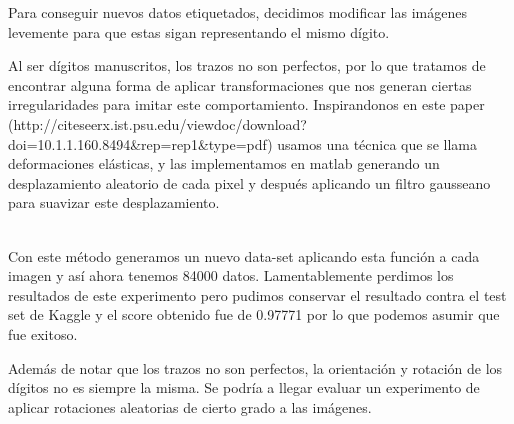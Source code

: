 Para conseguir nuevos datos etiquetados, decidimos modificar las imágenes levemente para que estas sigan representando el mismo dígito.

Al ser dígitos manuscritos, los trazos no son perfectos, por lo que tratamos de encontrar alguna forma de aplicar transformaciones que nos generan ciertas irregularidades para imitar este comportamiento. Inspirandonos en este paper (http://citeseerx.ist.psu.edu/viewdoc/download?doi=10.1.1.160.8494\&rep=rep1\&type=pdf)
usamos una técnica que se llama deformaciones elásticas, y las implementamos en matlab generando un desplazamiento aleatorio de cada pixel y después aplicando un filtro gausseano para suavizar este desplazamiento. \\

\begin{algorithm}[H]
\NoCaptionOfAlgo
\end{algorithm}

\\

Con este método generamos un nuevo data-set aplicando esta función a cada imagen y así ahora tenemos 84000 datos. Lamentablemente perdimos los resultados de este experimento pero pudimos conservar el resultado contra el test set de Kaggle y el score obtenido fue de 0.97771 por lo que podemos asumir que fue exitoso.

Además de notar que los trazos no son perfectos, la orientación y rotación de los dígitos no es siempre la misma. Se podría a llegar evaluar un experimento de aplicar rotaciones aleatorias de cierto grado a las imágenes.

